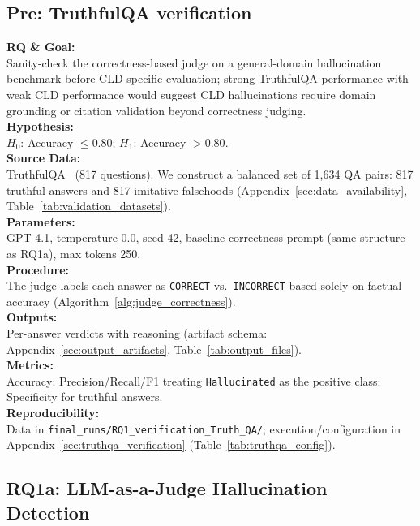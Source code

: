 \subsection{Pre: TruthfulQA verification}
\label{sec:rq1_verification}

\noindent\textbf{RQ \& Goal:}\\
Sanity-check the correctness-based judge on a general-domain hallucination benchmark before CLD-specific evaluation; strong TruthfulQA performance with weak CLD performance would suggest CLD hallucinations require domain grounding or citation validation beyond correctness judging.\\
\textbf{Hypothesis:}\\
$H_0$: Accuracy $\leq 0.80$; $H_1$: Accuracy $> 0.80$.\\
\textbf{Source Data:}\\
TruthfulQA~\cite{lin2022truthfulqa} (817 questions). We construct a balanced set of 1{,}634 QA pairs: 817 truthful answers and 817 imitative falsehoods (Appendix~\ref{sec:data_availability}, Table~\ref{tab:validation_datasets}).\\
\textbf{Parameters:}\\
GPT-4.1, temperature 0.0, seed 42, baseline correctness prompt (same structure as RQ1a), max tokens 250.\\
\textbf{Procedure:}\\
The judge labels each answer as \texttt{CORRECT} vs.\ \texttt{INCORRECT} based solely on factual accuracy (Algorithm~\ref{alg:judge_correctness}).\\
\textbf{Outputs:}\\
Per-answer verdicts with reasoning (artifact schema: Appendix~\ref{sec:output_artifacts}, Table~\ref{tab:output_files}).\\
\textbf{Metrics:}\\
Accuracy; Precision/Recall/F1 treating \texttt{Hallucinated} as the positive class; Specificity for truthful answers.\\
\textbf{Reproducibility:}\\
Data in \texttt{final\_runs/RQ1\_verification\_Truth\_QA/}; execution/configuration in Appendix~\ref{sec:truthqa_verification} (Table~\ref{tab:truthqa_config}).

\subsection{RQ1a: LLM-as-a-Judge Hallucination Detection}
\label{sec:rq1a_experiments}

